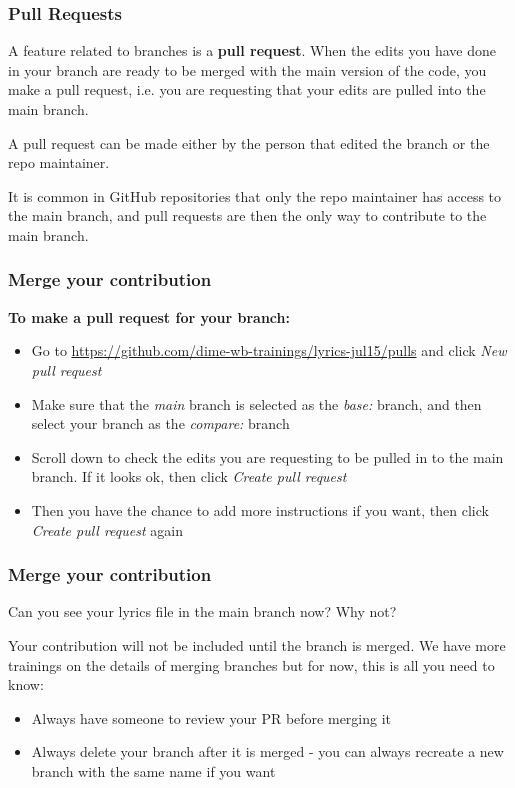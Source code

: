 \documentclass[aspectratio=169]{beamer}
\newcommand{\trainingURL}[1]{{\color{blue}\url{#1}}}
\newcommand{\traininerUsername}{dime-wb-trainings}
\newcommand{\repoName}{\traininerUsername/lyrics-jul15}
\newcommand{\trainingRepoURLwithParameter}[1]{\trainingURL{https://github.com/\repoName#1}}
\begin{document}
\begin{frame}
\frametitle{Pull Requests}

	A feature related to branches is a \textbf{pull request}.
	When the edits you have done in your branch
	are ready to be merged with the main version of the code,
	you make a pull request, i.e. you are requesting that
	your edits are pulled into the main branch.


	A pull request can be made either by the person that edited the branch or the repo maintainer.

	It is common in GitHub repositories that only the repo maintainer has access to the main branch, and pull requests are then the only way to contribute to the main branch.


\end{frame}

\begin{frame}
\frametitle{Merge your contribution}

	\textbf{To make a pull request for your branch:}
	\begin{itemize}
		\item Go to \trainingRepoURLwithParameter{/pulls} and click \textit{New pull request}
		\item Make sure that the \textit{main} branch is selected as the \textit{base:} branch, and then select your branch as the \textit{compare:} branch
		\item Scroll down to check the edits you are requesting to be pulled in to the main branch. If it looks ok, then click \textit{Create pull request}
		\item Then you have the chance to add more instructions if you want, then click \textit{Create pull request} again
	\end{itemize}
\end{frame}

\begin{frame}
\frametitle{Merge your contribution}

Can you see your lyrics file in the main branch now? Why not?

\vspace{.5cm}

Your contribution will not be included until the branch is merged. We have more trainings on the details of merging branches but for now, this is all you need to know:

	\begin{itemize}
		\item Always have someone to review your PR before merging it
		\item Always delete your branch after it is merged - you can always recreate a new branch with the same name if you want
	\end{itemize}

\end{frame}
\end{document}
